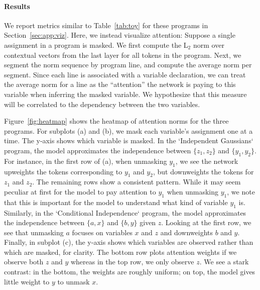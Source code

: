 \paragraph{Results} We report metrics similar to Table~\ref{tab:toy} for these programs in Section~\ref{sec:app:viz}. Here, we instead visualize attention: Suppose a single assignment in a program is masked. We first compute the L$_2$ norm over contextual vectors from the last layer for all tokens in the program. Next, we segment the norm sequence by program line, and compute the average norm per segment. Since each line is associated with a variable declaration, we can treat the average norm for a line as the ``attention'' the network is paying to this variable when inferring the masked variable. We hypothesize that this measure will be correlated to the dependency between the two variables.

Figure~\ref{fig:heatmap} shows the heatmap of attention norms for the three programs. For subplots (a) and (b), we mask each variable's assignment one at a time. The y-axis shows which variable is masked. In the `Independent Gaussians` program, the model approximates the independence between $\{z_1, z_2\}$ and $\{y_1, y_2\}$. For instance, in the first row of (a), when unmasking $y_1$, we see the network upweights the tokens corresponding to $y_1$ and $y_2$, but downweights the tokens for $z_1$ and $z_2$. The remaining rows show a consistent pattern. While it may seem peculiar at first for the model to pay attention to $y_1$ when unmasking $y_1$, we note that this is important for the model to understand what kind of variable $y_1$ is. Similarly, in the `Conditional Independence` program, the model approximates the independence between $\{a,x\}$ and $\{b, y\}$ given $z$. Looking at the first row, we see that unmasking $a$ focuses on variables $x$ and $z$ and downweights $b$ and $y$.
Finally, in subplot (c), the y-axis shows which variables are observed rather than which are masked, for clarity. The bottom row plots attention weights if we observe both $z$ and $y$ whereas in the top row, we only observe $z$. We see a stark contrast: in the bottom, the weights are roughly uniform; on top, the model gives little weight to $y$ to unmask $x$. 

